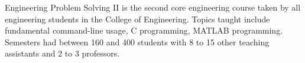 \resumeCompanyStart
\resumeCompanyEnd
\resumeItemListStart
        {
            Engineering Problem Solving II is the second core engineering course taken by all engineering students in the College of Engineering. Topics taught include fundamental command-line usage, C programming, MATLAB programming. Semesters had between 160 and 400 students with 8 to 15 other teaching assistants and 2 to 3 professors.
        }
\resumeItemListEnd